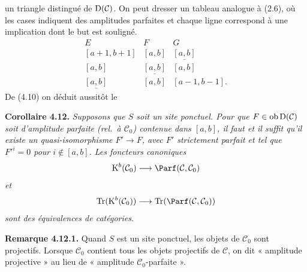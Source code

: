 un
triangle distingué de \(\Dpx(\mathcal C)\). On peut dresser un tableau analogue à (2.6), où les cases indiquent des amplitudes parfaites et chaque ligne correspond à une implication dont le but est souligné.
\[
\begin{array}{ccc}
E&F&G\\[0.3em]
{}[a+1,b+1]&{}[a,b]&\underline{[a,b]}\\
{}[a,b]&\underline{[a,b]}&{}[a,b]\\
\underline{[a,b]}&{}[a,b]&{}[a-1,b-1].
\end{array}
\]
De (4.10) on déduit aussitôt le

\textbf{Corollaire 4.12.} \emph{Supposons que \(S\) soit un site ponctuel. Pour que \(F\in\Ob\Dpx(\mathcal C)\) soit d'amplitude parfaite (rel.\ à \(\mathcal C_0\)) contenue dans \([a,b]\), il faut et il suffit qu'il existe un quasi-isomorphisme \(F'\to F\), avec \(F'\) strictement parfait et tel que \(F'^i=0\) pour \(i\notin[a,b]\). Les foncteurs canoniques}
\[
  \Kpx^b(\mathcal C_0)\longrightarrow\Parf(\mathcal C,\mathcal C_0)
\]
\emph{et}
\[
  \Tr(\Kpx^b(\mathcal C_0))\longrightarrow\Tr(\Parf(\mathcal C,\mathcal C_0))
\]
\emph{sont des équivalences de catégories}.

\textbf{Remarque 4.12.1.} Quand \(S\) est un site ponctuel, les objets de \(\mathcal C_0\) sont projectifs. Lorsque \(\mathcal C_0\) contient tous les objets projectifs de \(\mathcal C\), on dit « amplitude projective » au lieu de « amplitude \(\mathcal C_0\)-parfaite ».



\providecommand{\Cpx}{\mathrm C}
\providecommand{\Kpx}{\mathrm K}
\providecommand{\Dpx}{\mathrm D}
\providecommand{\Ho}{\mathrm H}
\providecommand{\RHom}{\mathrm R\!\operatorname{Hom}}
\renewcommand{\Ob}{\operatorname{ob}}
\providecommand{\qis}{\xrightarrow{\sim}}
\providecommand{\RHom}{\mathrm R\!\Hom}
\providecommand{\Ext}{\operatorname{Ext}}
\providecommand{\Hom}{\operatorname{Hom}}
\providecommand{\Tr}{\operatorname{Tr}}

\providecommand{\Add}{\operatorname{Add}}
\providecommand{\Cart}{\operatorname{Cart}}
\providecommand{\perfamp}{\operatorname{perf.amp}}
\providecommand{\perfdim}{\operatorname{perf.dim}}
\providecommand{\toramp}{\operatorname{tor.amp}}
\providecommand{\torf}{\operatorname{torf}}
\providecommand{\injf}{\operatorname{injf}}
\providecommand{\rg}{\operatorname{rg}}
\providecommand{\is}{\mathrm{is}}
\providecommand{\Mod}{\operatorname{Mod}}


